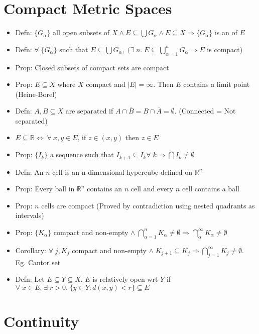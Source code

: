 \documentclass[11pt]{article}
\newcommand{\boxinate}[1]{\framebox[1.1\width]{#1}}
\begin{document}
\section{Compact Metric Spaces} %
\begin{itemize}
\item Defn: $\{G_{\alpha}\}$ all open subsets of $X \land E \subseteq \bigcup
  G_{\alpha} \land E \subseteq X \Rightarrow \{G_{\alpha}\}$ is an
  \boxinate{open cover} of $E$

\item Defn: $\forall\;\{G_{\alpha}\}$ such that $E \subseteq \bigcup G_{\alpha}
  ,\;(\exists\;n.\; E \subseteq \bigcup_{\alpha = 1}^n G_{\alpha} \Rightarrow
  E$ is compact)
\item Prop: Closed subsets of compact sets are compact
\item Prop: $E \subseteq X$ where $X$ compact and $|E| = \infty$. Then $E$
  contains a limit point (Heine-Borel)
\item Defn: $A, B \subseteq X$ are separated if $A \cap \overline{B} = B \cap
  \overline{A} = \emptyset$. (Connected = Not separated)
\item $E \subseteq \mathbb{R} \iff ~\forall~x,y \in E$, if $z \in (x, y)$ then
  $z \in E$
\item Prop: $\{I_k\}$ a sequence such that $I_{k+1} \subseteq I_k \forall\;k
  \Rightarrow \bigcap I_k \neq \emptyset$
\item Defn: An $n$ cell is an n-dimensional hypercube defined on $\mathbb{R}^n$
\item Prop: Every ball in $\mathbb{R}^n$ contains an $n$ cell and every $n$
  cell contains a ball
\item Prop: $n$ cells are compact (Proved by contradiction using nested
  quadrants as intervals)
\item Prop: $\{K_{\alpha}\}$ compact and non-empty $\land\; \bigcap_{\alpha =
  1}^n K_{\alpha} \neq \emptyset \Rightarrow \bigcap_{\alpha}^{\infty}
  K_{\alpha} \neq \emptyset$
\item Corollary: $\forall\;j, K_j$ compact and non-empty $\land \;K_{j+1}
  \subseteq K_j \Rightarrow \bigcap_{j=1}^{\infty} K_j \neq
  \emptyset$. Eg. Cantor set
\item Defn: Let $E \subseteq Y \subseteq X$. $E$ is relatively open wrt $Y$ if
  $\forall\;x \in E.\;\exists\;r > 0.\;\{y \in Y: d(x, y) < r\} \subseteq E$
\end{itemize}

\section{Continuity}
\end{document}
